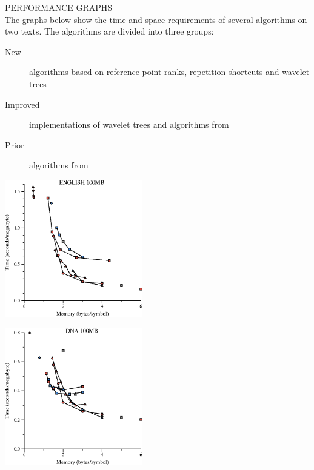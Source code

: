 {\sffamily\normalsize{\color{sciorange} PERFORMANCE GRAPHS}}\vspace{1mm}\\
\footnotesize 
The graphs below show the time and space requirements of several
algorithms on two texts.  The algorithms are divided
into three groups:
\begin{description}
\item[\color{new}New] algorithms based on reference point ranks, repetition
shortcuts and wavelet trees
\item[\color{improved}Improved] implementations of wavelet trees and
algorithms from~\cite{ll2005}
\item[\color{prior}Prior] algorithms from~\cite{s2001,ll2005}
\end{description}
\vspace{2mm}

\includegraphics[width=60mm]{eng100Mb-new}
\vspace{2mm}

\includegraphics[width=60mm]{dna100Mb-new}

